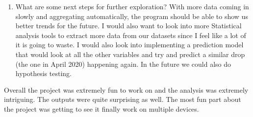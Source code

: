 \documentclass[fontsize=11pt]{article}
\begin{document}
\begin{enumerate}
        \item What are some next steps for further exploration?
        With more data coming in slowly and aggregating automatically, the program should be able to show us better trends for the future. I would also want to look into more Statistical analysis tools to extract more data from our datasets since I feel like a lot of it is going to waste. I would also look into implementing a prediction model that would look at all the other variables and try and predict a similar drop (the one in April 2020) happening again. In the future we could also do hypothesis testing.
    \end{enumerate}
    Overall the project was extremely fun to work on and the analysis was extremely intriguing. The outputs were quite surprising as well. The most fun part about the project was getting to see it finally work on multiple devices.
    \printbibliography
\end{document}
